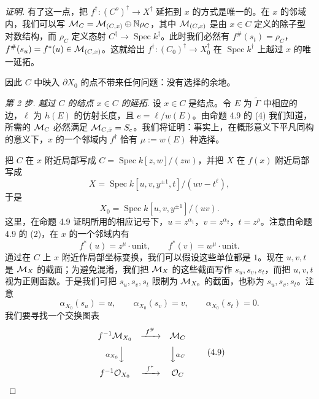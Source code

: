 \begin{proof}[证明]
有了这一点，把 $f^\dagger:(C^o)^\dagger\to X^\dagger$ 延拓到 $x$ 的方式是唯一的。在 $x$ 的邻域内，我们可以写 $\mathcal{M}_C=\mathcal{M}_{(C,x)}\oplus\mathbb{N}\rho_C$，其中 $\mathcal{M}_{(C,x)}$ 是由 $x\in C$ 定义的除子型对数结构，而 $\rho_C$ 定义态射 $C^\dagger\to\operatorname{Spec}k^\dagger$。此时我们必然有 $f^\#(s_t)=\rho_C$，$f^\#(s_u)=f^*(u)\in\mathcal{M}_{(C,x)}$。这就给出 $f^\dagger:(C_0)^\dagger\to X_0^\dagger$ 在 $\operatorname{Spec}k^\dagger$ 上越过 $x$ 的唯一延拓。


因此 $C$ 中映入 $\partial X_0$ 的点不带来任何问题：没有选择的余地。

\emph{第 2 步. 越过 $C$ 的结点 $x\in C$ 的延拓.} 设 $x\in C$ 是结点。令 $E$ 为 $\tilde\Gamma$ 中相应的边，$\ell$ 为 $h(E)$ 的仿射长度，且 $e=\ell/w(E)$。由命题 4.9 的 (4) 我们知道，所需的 $\mathcal{M}_C$ 必然满足 $\mathcal{M}_{C,\bar x}=S_e$。我们将证明：事实上，在概形意义下平凡同构的意义下，$x$ 的一个邻域内 $f^\dagger$ 恰有 $\mu:=w(E)$ 种选择。

把 $C$ 在 $x$ 附近局部写成 $C=\operatorname{Spec}k[z,w]/(zw)$，并把 $X$ 在 $f(x)$ 附近局部写成
\[
X=\operatorname{Spec}k[u,v,y^{\pm1},t]/(uv-t^\ell),
\]
于是
\[
X_0=\operatorname{Spec}k[u,v,y^{\pm1}]/(uv).
\]
这里，在命题 4.9 证明所用的相应记号下，$u=z^{\alpha_1}$，$v=z^{\alpha_2}$，$t=z^\rho$。注意由命题 4.9 的 (2)，在 $x$ 的一个邻域内有
\[
f^*(u)=z^\mu\cdot\mathrm{unit},\qquad f^*(v)=w^\mu\cdot\mathrm{unit}.
\]
通过在 $C$ 上 $x$ 附近作局部坐标变换，我们可以假设这些单位都是 $1$。现在 $u,v,t$ 是 $\mathcal{M}_X$ 的截面；为避免混淆，我们把 $\mathcal{M}_X$ 的这些截面写作 $s_u,s_v,s_t$，而把 $u,v,t$ 视为正则函数。于是我们可把 $s_u,s_v,s_t$ 限制为 $\mathcal{M}_{X_0}$ 的截面，也称为 $s_u,s_v,s_t$。注意
\[
\alpha_{X_0}(s_u)=u,\qquad\alpha_{X_0}(s_v)=v,\qquad\alpha_{X_0}(s_t)=0.
\]
我们要寻找一个交换图表
\begin{equation}
\begin{array}{ccc}
f^{-1}\mathcal{M}_{X_0} & \xrightarrow{\ f^\#\ } & \mathcal{M}_C\\[6pt]
{\scriptstyle\alpha_{X_0}}\Big\downarrow & & \Big\downarrow{\scriptstyle\alpha_C}\\[6pt]
f^{-1}\mathcal{O}_{X_0} & \xrightarrow{\ f^*\ } & \mathcal{O}_C
\end{array}
\tag{4.9}
\end{equation}


\end{proof}
